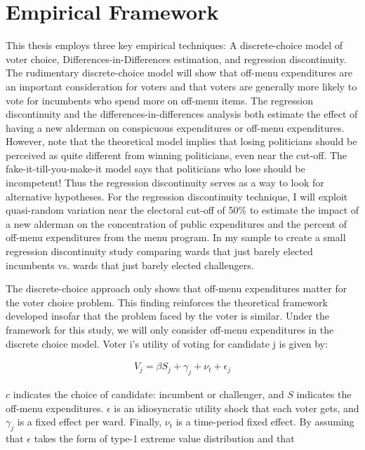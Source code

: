 \section*{Empirical Framework}
This thesis employs three key empirical techniques: A discrete-choice model of voter choice, Differences-in-Differences estimation, and regression discontinuity. 
The rudimentary discrete-choice model will show that off-menu expenditures are an important consideration for voters and that voters are generally more likely to vote for incumbents who spend more on off-menu items. 
The regression discontinuity and the differences-in-differences analysis both estimate the effect of having a new alderman on conspicuous expenditures or off-menu expenditures. 
However, note that the theoretical model implies that losing politicians should be perceived as quite different from winning politicians, even near the cut-off. 
The fake-it-till-you-make-it model says that politicians who lose should be incompetent! Thus the regression discontinuity serves as a way to look for alternative hypotheses. 
For the regression discontinuity technique, I will exploit quasi-random variation near the electoral cut-off of 50\% to estimate the impact of a new alderman on the concentration of public expenditures and the percent of off-menu expenditures from the menu program. 
In my sample to create a small regression discontinuity study comparing wards that just barely elected incumbents vs. 
wards that just barely elected challengers. 

The discrete-choice approach only shows that off-menu expenditures matter for the voter choice problem. 
This finding reinforces the theoretical framework developed insofar that the problem faced by the voter is similar. 
Under the framework for this study, we will only consider off-menu expenditures in the discrete choice model. 
Voter i's utility of voting for candidate j is given by:

\begin{align*}
    V_{j}= \beta S_{j}+ \gamma_{j}+\nu_{t}+\epsilon_{j}
\end{align*}

$c$ indicates the choice of candidate: incumbent or challenger, and $S$ indicates the off-menu expenditures. 
$\epsilon$ is an idiosyncratic utility shock that each voter gets, and $\gamma_{j}$ is a fixed effect per ward. 
Finally, $\nu_{t}$ is a time-period fixed effect. 
 By assuming that $\epsilon$ takes the form of type-1 extreme value distribution and that 

